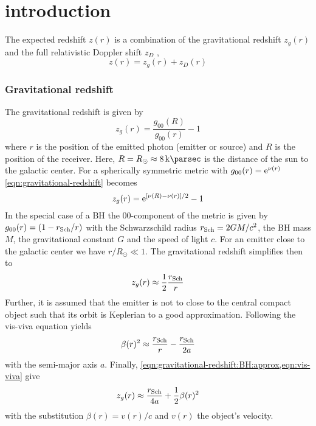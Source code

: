 \documentclass[nofootinbib,tightenlines,nobibnotes,aps,prl,preprint,superscriptaddress]{revtex4-1}
\begin{document}

\maketitle



\section{introduction}
The expected redshift $z(r)$ is a combination of the gravitational redshift $z_g(r)$ and the full relativistic Doppler shift $z_D$ \citep{2006ApJ...639L..21Z}, \begin{equation}
	\label{eqn:redshift}
	z(r) = z_g(r) + z_D(r)
\end{equation}

\subsubsection*{Gravitational redshift}
The gravitational redshift is given by \begin{equation}
	\label{eqn:gravitational-redshift}
	z_g(r) = \frac{g_{00}(R)}{g_{00}(r)} - 1
\end{equation} where $r$ is the position of the emitted photon (emitter or source) and $R$ is the position of the receiver. Here, $R = R_\odot \approx \SI{8}{\kilo\parsec}$ is the distance of the sun to the galactic center. For a spherically symmetric metric with $g_{00}(r) = \mathrm{e}^{\nu(r)}$ \cref{eqn:gravitational-redshift} becomes \begin{equation}
	z_g(r) = \mathrm{e}^{[\nu(R) - \nu(r)]/2} - 1
\end{equation} In the special case of a BH the $00$-component of the metric is given by $g_{00}(r) = (1 - r_{\rm Sch}/r)$ with the Schwarzschild radius $r_{\rm Sch} = 2 G M/c^2$, the BH mass $M$, the gravitational constant $G$ and the speed of light $c$. For an emitter close to the galactic center we have $r/R_\odot \ll 1$. The gravitational redshift simplifies then to \begin{equation}
	\label{eqn:gravitational-redshift:BH:approx}
	z_g(r) \approx \frac12 \frac{r_{\rm Sch}}{r}
\end{equation} Further, it is assumed that the emitter is not to close to the central compact object such that its orbit is Keplerian to a good approximation. Following the vis-viva equation yields \begin{equation}
	\label{eqn:vis-viva}
	\beta(r)^2 \approx \frac{r_{\rm Sch}}{r} - \frac{r_{\rm Sch}}{2 a}
\end{equation} with the semi-major axis $a$. Finally, \cref{eqn:gravitational-redshift:BH:approx,eqn:vis-viva} give \begin{equation}
	z_g(r) \approx \frac{r_{\rm Sch}}{4a} + \frac12 \beta(r)^2
\end{equation} with the substitution $\beta(r) = v(r)/c$ and $v(r)$ the object's velocity.
\end{document}
